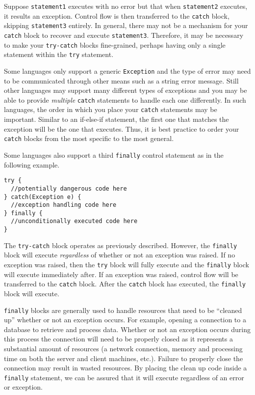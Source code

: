 Suppose \texttt{statement1} executes with no error but
that when \texttt{statement2} executes, it results an
exception.  Control flow is then transferred to the \texttt{catch}
block, skipping \texttt{statement3} entirely.  In 
general, there may not be a mechanism for your \texttt{catch}
block to recover and execute \texttt{statement3}.
Therefore, it may be necessary to make your \texttt{try-catch}
blocks fine-grained, perhaps having only a single statement within
the \texttt{try} statement.

Some languages only support a generic \texttt{Exception} and
the type of error may need to be communicated through other means 
such as a string error message.  Still other languages may support
many different types of exceptions and you may be able to provide
\emph{multiple} \texttt{catch} statements to handle each
one differently.  In such languages, the order in which you place
your \texttt{catch} statements may be important.  Similar
to an if-else-if statement, the first one that matches the exception
will be the one that executes.  Thus, it is best practice to order
your \texttt{catch} blocks from the most specific to the
most general. 

Some languages also support a third \texttt{finally} control
statement as in the following example.

\begin{verbatim}
try {
  //potentially dangerous code here  
} catch(Exception e) {
  //exception handling code here
} finally {
  //unconditionally executed code here
}
\end{verbatim}

The \texttt{try-catch} block operates as previously 
described.  However, the \texttt{finally} block will
execute \emph{regardless} of whether or not an exception
was raised.  If no exception was raised, then the \texttt{try}
block will fully execute and the \texttt{finally} block
will execute immediately after.  If an exception was raised, 
control flow will be transferred to the \texttt{catch}
block.  After the \texttt{catch} block has executed, the
\texttt{finally} block will execute.

\texttt{finally} blocks are generally used to handle
resources that need to be ``cleaned up'' whether or not an
exception occurs.  For example, opening a connection to a
database to retrieve and process data.  Whether or not
an exception occurs during this process the connection will
need to be properly closed as it represents a substantial 
amount of resources (a network connection, memory and
processing time on both the server and client machines, 
etc.).  Failure to properly close the connection may result
in wasted resources.  By placing the clean up code inside
a \texttt{finally} statement, we can be assured that
it will execute regardless of an error or exception.

